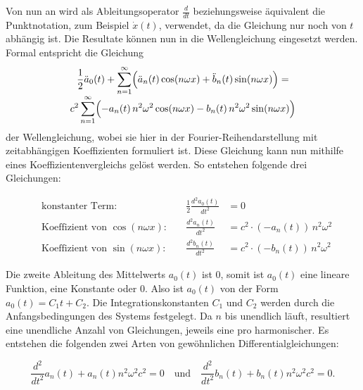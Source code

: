 Von nun an wird als Ableitungsoperator $\frac{d}{dt}$ beziehungsweise äquivalent die Punktnotation, zum Beispiel $\dot{x}(t)$, verwendet, da die Gleichung nur noch von $t$ abhängig ist. Die Resultate können nun in die Wellengleichung eingesetzt werden. 
Formal entspricht die Gleichung
\begin{multline}
	\frac{1}{2}\ddot{a}_0(t)
	+ \sum_{n=1}^{\infty}\Bigl(
	\ddot{a}_n(t)\cos(n\omega x)
	+ \ddot{b}_n(t)\sin(n\omega x)
	\Bigr)
	= \\[-0.8ex]
	c^2 \sum_{n=1}^{\infty}\Bigl(
	-a_n(t)\,n^2\omega^2\cos(n\omega x)
	-b_n(t)\,n^2\omega^2\sin(n\omega x)
	\Bigr)
\end{multline}
der Wellengleichung, wobei sie hier in der Fourier-Reihendarstellung mit zeitabhängigen Koeffizienten formuliert ist.
Diese Gleichung kann nun mithilfe eines Koeffizientenvergleichs gelöst werden.
%
So entstehen folgende drei Gleichungen:

\begin{equation}
	\begin{alignedat}{2}
		&\text{konstanter Term:} 
		&\quad \frac{1}{2} \frac{d^2 a_0(t)}{dt^2} &= 0 \\[0.8em]
		&\text{Koeffizient von }\cos(n\omega x): 
		&\quad \frac{d^2 a_n(t)}{dt^2} &= c^2 \cdot (-a_n(t))\,n^2\omega^2 \\[0.8em]
		&\text{Koeffizient von }\sin(n\omega x): 
		&\quad \frac{d^2 b_n(t)}{dt^2} &= c^2 \cdot (-b_n(t))\,n^2\omega^2
	\end{alignedat}
\end{equation}

Die zweite Ableitung des Mittelwerts $a_0(t)$ ist 0, somit ist $a_0(t)$ eine lineare Funktion, eine Konstante oder 0. Also ist $a_0(t)$ von der Form $a_0(t)=C_1 t + C_2$.
Die Integrationskonstanten $C_1$ und $C_2$ werden durch die Anfangsbedingungen des Systems festgelegt.
Da $n$ bis unendlich läuft, resultiert eine unendliche Anzahl von Gleichungen, jeweils eine pro harmonischer.
Es entstehen die folgenden zwei Arten von gewöhnlichen Differentialgleichungen:

\begin{equation}\label{eq:ODE_Wellengleichung}
	\frac{d^2}{dt^2} a_n(t) + a_n(t) n^2 \omega^2 c^2 = 0
	  \quad   \text{und} \quad  \frac{d^2}{dt^2} b_n(t) + b_n(t) n^2 \omega^2 c^2 = 0.
\end{equation}

